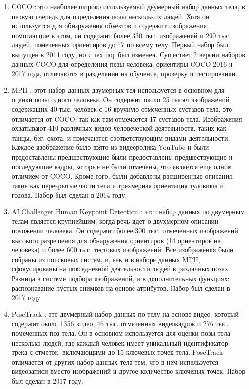 \begin{enumerate}[label=\arabic*)]
	
	\item COCO \cite{COCO}: это наиболее широко используемый двумерный набор данных тела, в первую очередь для определения позы нескольких людей.
	Хотя он используется для обнаружения объектов и содержит изображения, помогающие в этом, он содержит более 330 тыс. изображений и 200 тыс. людей, помеченных ориентиров до 17 по всему телу.
	Первый набор был выпущен в 2014 году, но с тех пор был изменен.
	Существет 2 версии наборов данных COCO для определения позы человека: ориентиры COCO 2016 и 2017 года, отличаются в разделении на обучение, проверку и тестировании.
	
	\item  MPII \cite{MPII}: этот набор данных двумерных тел используется в основном для оценки позы одного человека.
	Он содержит около 25 тысяч изображений, содержащих 40 тыс. человек с 16 вручную отмеченных суставов тела, это отличается от COCO, так как там отмечается 17 суставов тела.
	Изображения охватывают 410 различных видов человеческой деятельности, таких как танцы, бег, охота, и помечаются соответствующим видами деятельности.
	Каждое изображение было взято из видеоролика YouTube и были предоставлены предшествующие были предоставлены предшествующие и последующие кадры, которые не были отмечены, что является еще одним отличием от COCO. 
	Кроме того, были добавлены расширенные описания, такие как перекрытые части тела и трехмерная ориентация туловища и голова.
	Набор был сделан в 2014 году.
	
	\item AI Challenger Human Keypoint Detection \cite{AI_chlenger}: этот набор данных по двумерным телам является крупнейшим, когда речь идет о двухмерном описании положении человека.
	Он содержит более 300 тыс. отмеченных изображений высокого разрешения для обнаружения ориентиров (14 ориентиров на человека) и более 600 тыс. тестовых изображений.
	Все изображения были собраны из поисковых систем, и, как и в наборе данных MPII, сфокусированы на повседневной деятельности людей в различных позах.
	Разница в системе подбора изображений, и в дополнительных функциях: распознавание пустых снимков на основе атрибутов.
	Набор был сделан в 2017 году.
	
	\item PoseTrack \cite{PoseTrack}: это двумерный набор данных по телу на основе видео, который содержит около 1356 видео, 46 тыс. отмеченных видеокадров и 276 тыс. помеченных поз тела.
	Он в основном используется для оценки позы тела несколько людей, где каждый человек имеет уникальный идентификатор трека с отметок, включающими до 15 ключевых точек тела.
	PoseTrack отличается от других набор данных тела тем, что в нем используется видеозаписи вместо изображений и другое количество ключевых точек.
	Набор был сделан в 2017 году.
	
\end{enumerate}

